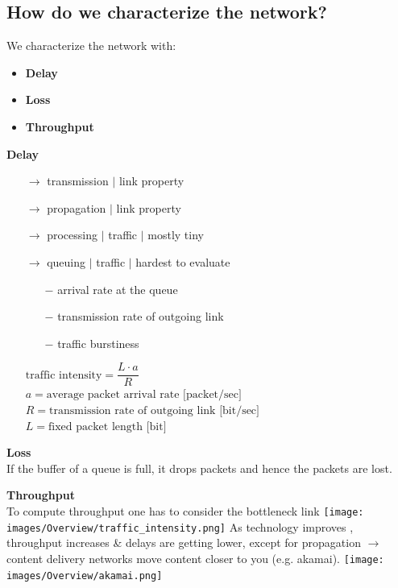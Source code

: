 \documentclass[a4paper, fontsize=8pt, landscape, DIV=1]{scrartcl}
\begin{document}
\begin{multicols*}{4}
				\subsection{How do we characterize the network?}
				We characterize the network with:
				\begin{itemize}[noitemsep]
					\item \textbf{Delay}	
					\item \textbf{Loss}
					\item \textbf{Throughput} 
				\end{itemize}
				\textbf{Delay}
				\vspace{-0.2cm}
				\begin{itemize}[noitemsep]
					\item[$\rightarrow$] transmission $\vert$ link property
					\item[$\rightarrow$] propagation $\vert$ link property
					\item[$\rightarrow$] processing $\vert$ traffic $\vert$ mostly tiny
					\item[$\rightarrow$] queuing $\vert$ traffic $\vert$ hardest to evaluate
					\begin{itemize}
						\item[$-$] arrival rate at the queue
						\item[$-$] transmission rate of outgoing link
						\item[$-$] traffic burstiness 
					\end{itemize}
					$\text{traffic intensity} = \dfrac{L\cdot a}{R}$\\
					$a = \text{average packet arrival rate [packet/sec]} $\\
					$R = \text{transmission rate of outgoing link [bit/sec]} $\\
					$L = \text{fixed packet length [bit]} $	
				\end{itemize}
			\textbf{Loss}\\
			If the buffer of a queue is full, it drops packets and hence the packets are lost.\par
			\textbf{Throughput}\\
			To compute throughput one has to consider the bottleneck link
			\texttt{[image: images/Overview/traffic\_intensity.png]}
			As technology improves , throughput increases \& delays are getting lower, except for propagation $\rightarrow$ content delivery networks move content closer to you (e.g. akamai).
			\texttt{[image: images/Overview/akamai.png]}
			\newpage 
			

\end{multicols*}
\end{document}
